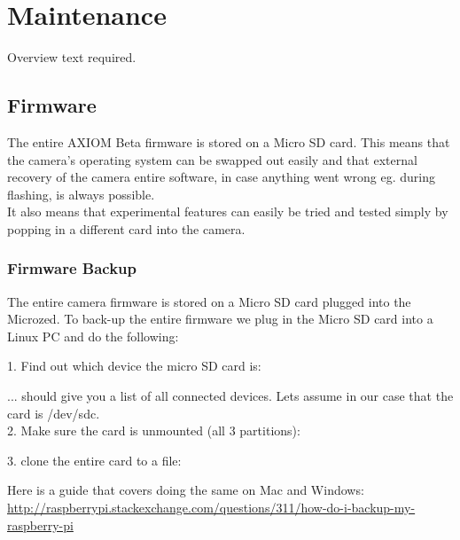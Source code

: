\section{Maintenance}

Overview text required.





\subsection{Firmware}

The entire AXIOM Beta firmware is stored on a Micro SD card. This means that the camera's operating system can be swapped out easily and that external recovery of the camera entire software, in case anything went wrong eg. during flashing, is always possible.\\ 

It also means that experimental features can easily be tried and tested simply by popping in a different card into the camera. 





\subsubsection{Firmware Backup}

The entire camera firmware is stored on a Micro SD card plugged into the Microzed. To back-up the entire firmware we plug in the Micro SD card into a Linux PC and do the following:

1. Find out which device the micro SD card is: 


... should give you a list of all connected devices. Lets assume in our case that the card is /dev/sdc.\\


2. Make sure the card is unmounted (all 3 partitions): 

    
    
3. clone the entire card to a file: 


Here is a guide that covers doing the same on Mac and Windows: \href{http://raspberrypi.stackexchange.com/questions/311/how-do-i-backup-my-raspberry-pi}{http://raspberrypi.stackexchange.com/questions/311/how-do-i-backup-my-raspberry-pi}






